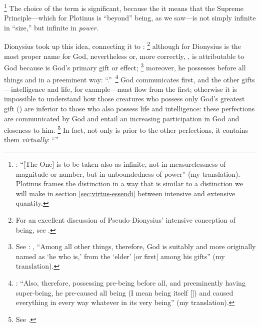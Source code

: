 %
\footnote{\cite[VI,~9,~6]{plotinus:enneads}: ``[The One] is to be taken also as infinite, not in measurelessness of magnitude or number, but in unboundedness of power'' (my translation). Plotinus frames the distinction in a way that is similar to a distinction we will make in section \ref{sec:virtus-essendi} between intensive and extensive quantity.} The choice of the term  is significant, because the it means that the Supreme Principle---which for Plotinus is ``beyond'' being, as we saw---is not simply infinite in ``size,'' but infinite in \emph{power}.

Dionysius took up this idea, connecting it to :%
%
\footnote{For an excellent  discussion of Pseudo-Dionysius' intensive conception of being, see \cite[50--56]{orourke:pseudo-dionysius}.} although for Dionysius  is the most proper name for God, nevertheless  or, more correctly, , is attributable to God because  is God's primary gift or effect;%
%
\footnote{See \cite[V, 5]{pg:dionysius:DN}: , ``Among all other things, therefore, God is suitably and more originally named as `he who is,' from the `elder' [or first] among his gifts'' (my translation).} moreover, he possesses  before all things and in a preeminent way: ``.''\,%
%
\footnote{\Cite[V, 5]{pg:dionysius:DN}: ``Also, therefore, possessing pre-being before all, and preeminently having super-being, he pre-caused all being (I mean being itself []) and caused everything in every way whatever in its very being'' (my translation).} God communicates  first, and the other gifts---intelligence and life, for example---must flow from the first; otherwise it is impossible to understand how those creatures who possess only God's greatest gift () are inferior to those who also possess life and intelligence: these perfections are communicated by God and entail an increasing participation in God and closeness to him.%
%
\footnote{See \cite[V, 2]{pg:dionysius:DN}.} In fact, not only is  prior to the other perfections, it contains them \emph{virtually}: ``''\,%
